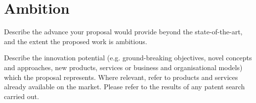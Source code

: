 \section{Ambition}

Describe the advance your proposal would provide beyond the state-of-the-art, and the extent the proposed work is ambitious.

Describe the innovation potential (e.g. ground-breaking objectives, novel concepts and approaches, new products, services or business and organisational models) which the proposal represents. Where relevant, refer to products and services already available on the market. Please refer to the results of any patent search carried out.